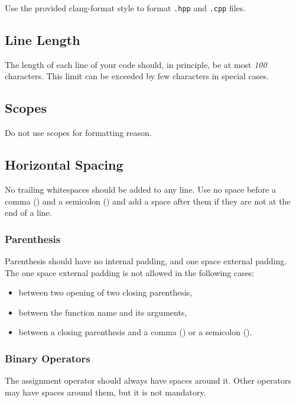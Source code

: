 Use the provided clang-format style to format \verb|.hpp| and \verb|.cpp| files.

\subsection{Line Length}

The length of each line of your code should, in principle, be at most \emph{100} characters.
This limit can be exceeded by few characters in special cases.

\subsection{Scopes}

Do not use scopes for formatting reason.

\subsection{Horizontal Spacing}

No trailing whitespaces should be added to any line.
Use no space before a comma (\inlinecode{,}) and a semicolon (\inlinecode{;}) and add a space after them if they are not at the end of a line.

\subsubsection{Parenthesis}

Parenthesis should have no internal padding, and one space external padding.
The one space external padding is not allowed in the following cases:
\begin{itemize} \itemsep -3pt
 \vspace{-2ex}
 \item between two opening of two closing parenthesis,
 \item between the function name and its arguments,
 \item between a closing parenthesis and a comma (\inlinecode{,}) or a semicolon (\inlinecode{;}).
\end{itemize}

\subsubsection{Binary Operators}

The assignment operator should always have spaces around it.
Other operators may have spaces around them, but it is not mandatory.

